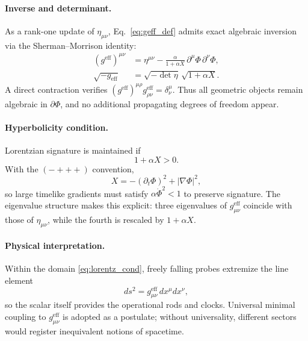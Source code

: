 \documentclass{article}
\begin{document}
\paragraph*{Inverse and determinant.}
As a rank-one update of $\eta_{\mu\nu}$, Eq.~\eqref{eq:geff_def} admits exact algebraic inversion via the Sherman–Morrison identity:
\begin{align}
(g^{\mathrm{eff}})^{\mu\nu}
&= \eta^{\mu\nu}
 - \frac{\alpha}{1+\alpha X}\,\partial^\mu\Phi\,\partial^\nu\Phi ,
\label{eq:geff_inv}\\[4pt]
\sqrt{-g_{\mathrm{eff}}}
&= \sqrt{-\det\eta}\,\sqrt{1+\alpha X}.
\label{eq:geff_det}
\end{align}
A direct contraction verifies $(g^{\mathrm{eff}})^{\mu\rho}g^{\mathrm{eff}}_{\rho\nu}=\delta^\mu_\nu$. Thus all geometric objects remain algebraic in $\partial\Phi$, and no additional propagating degrees of freedom appear.

\paragraph*{Hyperbolicity condition.}
Lorentzian signature is maintained if
\begin{equation}
1+\alpha X > 0 .
\label{eq:lorentz_cond}
\end{equation}
With the $(-+++)$ convention,
\begin{equation}
X = -(\partial_t\Phi)^2 + |\nabla\Phi|^2 ,
\label{eq:Xexplicit}
\end{equation}
so large timelike gradients must satisfy $\alpha\dot\Phi^2<1$ to preserve signature. The eigenvalue structure makes this explicit: three eigenvalues of $g^{\mathrm{eff}}_{\mu\nu}$ coincide with those of $\eta_{\mu\nu}$, while the fourth is rescaled by $1+\alpha X$.

\paragraph*{Physical interpretation.}
Within the domain \eqref{eq:lorentz_cond}, freely falling probes extremize the line element
\begin{equation}
ds^2 = g^{\mathrm{eff}}_{\mu\nu}\,dx^\mu dx^\nu ,
\label{eq:line_element}
\end{equation}
so the scalar itself provides the operational rods and clocks. Universal minimal coupling to $g^{\mathrm{eff}}_{\mu\nu}$ is adopted as a postulate; without universality, different sectors would register inequivalent notions of spacetime.
\end{document}
